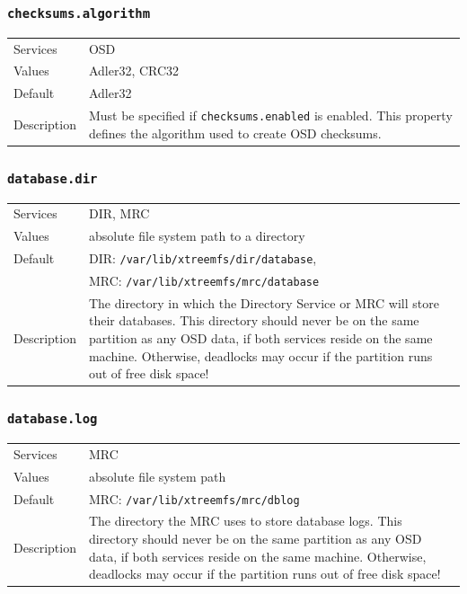 \documentclass[a4paper,10pt]{book}
\begin{document}
\subsubsection{\texttt{checksums.algorithm}}
\begin{tabular}{lp{10cm}}
 Services & OSD\\
 Values   & Adler32, CRC32 \\
 Default  & Adler32 \\
 Description & Must be specified if \texttt{checksums.enabled} is enabled. This property defines the algorithm used to create OSD checksums.
\end{tabular}

\subsubsection{\texttt{database.dir}}
\begin{tabular}{lp{10cm}}
 Services & DIR, MRC\\
 Values   & absolute file system path to a directory\\
 Default  & DIR: \texttt{/var/lib/xtreemfs/dir/database},\\
 & MRC: \texttt{/var/lib/xtreemfs/mrc/database}\\
 Description & The directory in which the Directory Service or MRC will store their databases. This directory should never be on the same partition as any OSD data, if both services reside on the same machine. Otherwise, deadlocks may occur if the partition runs out of free disk space!
\end{tabular}

\subsubsection{\texttt{database.log}}
\begin{tabular}{lp{10cm}}
 Services & MRC\\
 Values   & absolute file system path\\
 Default  & MRC: \texttt{/var/lib/xtreemfs/mrc/dblog}\\
 Description & The directory the MRC uses to store database logs. This directory should never be on the same partition as any OSD data, if both services reside on the same machine. Otherwise, deadlocks may occur if the partition runs out of free disk space!
\end{tabular}
\end{document}
